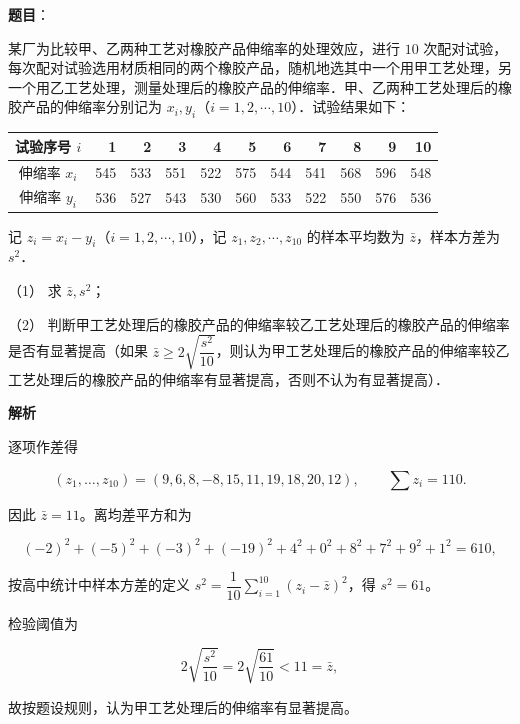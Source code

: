 \begin{answer}

\textbf{题目}：

某厂为比较甲、乙两种工艺对橡胶产品伸缩率的处理效应，进行 $10$ 次配对试验，每次配对试验选用材质相同的两个橡胶产品，随机地选其中一个用甲工艺处理，另一个用乙工艺处理，测量处理后的橡胶产品的伸缩率．甲、乙两种工艺处理后的橡胶产品的伸缩率分别记为 $x_i,y_i$（$i=1,2,\cdots,10$）．试验结果如下：

\begin{center}
\begingroup\setlength{\tabcolsep}{4pt}
\begin{tabular}{crrrrrrrrrr}
\toprule
试验序号 $i$ & 1 & 2 & 3 & 4 & 5 & 6 & 7 & 8 & 9 & 10 \\
\midrule
伸缩率 $x_i$ & 545 & 533 & 551 & 522 & 575 & 544 & 541 & 568 & 596 & 548 \\
伸缩率 $y_i$ & 536 & 527 & 543 & 530 & 560 & 533 & 522 & 550 & 576 & 536 \\
\bottomrule
\end{tabular}
\endgroup
\end{center}

记 $z_i=x_i-y_i$（$i=1,2,\cdots,10$），记 $z_1,z_2,\cdots,z_{10}$ 的样本平均数为 $\bar z$，样本方差为 $s^2$．

（1） 求 $\bar z,s^2$；

（2） 判断甲工艺处理后的橡胶产品的伸缩率较乙工艺处理后的橡胶产品的伸缩率是否有显著提高（如果 $\bar z\geqslant2\sqrt{\dfrac{s^2}{10}}$，则认为甲工艺处理后的橡胶产品的伸缩率较乙工艺处理后的橡胶产品的伸缩率有显著提高，否则不认为有显著提高）．

\textbf{解析}


逐项作差得

\nopagebreak[4]
\[
(z_1,\ldots,z_{10})=(9,6,8,-8,15,11,19,18,20,12),\qquad \sum z_i=110.
\]

因此 $\bar z=11$。离均差平方和为

\nopagebreak[4]
\[
(-2)^2+(-5)^2+(-3)^2+(-19)^2+4^2+0^2+8^2+7^2+9^2+1^2=610,
\]

按高中统计中样本方差的定义 $s^2=\dfrac1{10}\sum_{i=1}^{10}(z_i-\bar z)^2$，得 $s^2=61$。


检验阈值为

\nopagebreak[4]
\[
2\sqrt{\frac{s^2}{10}}=2\sqrt{\frac{61}{10}}<11=\bar z,
\]

故按题设规则，认为甲工艺处理后的伸缩率有显著提高。



\end{answer}
